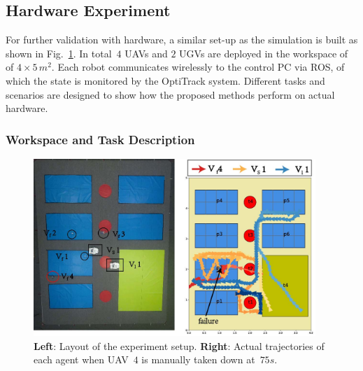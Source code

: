 \subsection{Hardware Experiment}\label{subsec:hardware-experiment}
For further validation with hardware,
a similar set-up as the simulation is built as shown in Fig.~\ref{fig:ws}.
In total~$4$ UAVs and $2$ UGVs are deployed in the workspace of of $4\times5\, m^2$.
Each robot communicates wirelessly to the control PC via ROS,
of which the state is monitored by the OptiTrack system.
Different tasks and scenarios are designed to show
how the proposed methods perform on actual hardware.

\subsubsection{Workspace and Task Description}\label{subsubsec:hw-ws-task}

\begin{figure}[t!]
  \begin{minipage}[t]{1\linewidth}
    \centering
	\includegraphics[width =0.95\textwidth]{figures/hardware_experiment/figure_12.jpg}
\end{minipage}%
\caption{\textbf{Left}:
Layout of the experiment setup.
\textbf{Right}: Actual trajectories of each agent when UAV~$4$ is manually taken down at~$75s$.
}
\label{fig:ws}
\end{figure}

